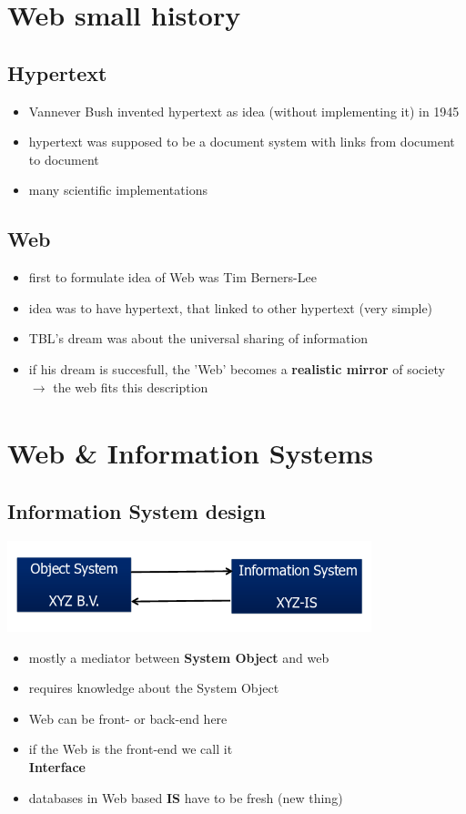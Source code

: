 \documentclass[a4paper]{article}
\begin{document}
\section{Web small history}
	\subsection{Hypertext}
		\begin{itemize}
		\setlength{\itemsep}{-3pt}
		\item Vannever Bush invented hypertext as idea (without implementing it) in 1945
		\item hypertext was supposed to be a document system with links from document to document
		\item many scientific implementations 
		\end{itemize}
	\subsection{Web}
		\begin{itemize}
		\setlength{\itemsep}{-3pt}
		\item first to formulate idea of Web was Tim Berners-Lee
		\item idea was to have hypertext, that linked to other hypertext (very simple)
		\item TBL's dream was about the universal sharing of information
		\item if his dream is succesfull, the 'Web' becomes a {\bf realistic mirror} of society \\
		$\xrightarrow[]{}$ the web fits this description
	\end{itemize}
\section{Web \& Information Systems}
	\subsection{Information System design}
		\includegraphics[width=300pt]{img/IS-Visualization.png}
		\begin{itemize}
		\setlength{\itemsep}{-3pt}
		\item mostly a mediator between {\bf System Object} and web
		\item requires knowledge about the System Object
		\item Web can be front- or back-end here
		\item if the Web is the front-end we call it \\{\bf Interface}
		\item databases in Web based {\bf IS} have to be fresh (new thing)
		\end{itemize}
\end{document}
